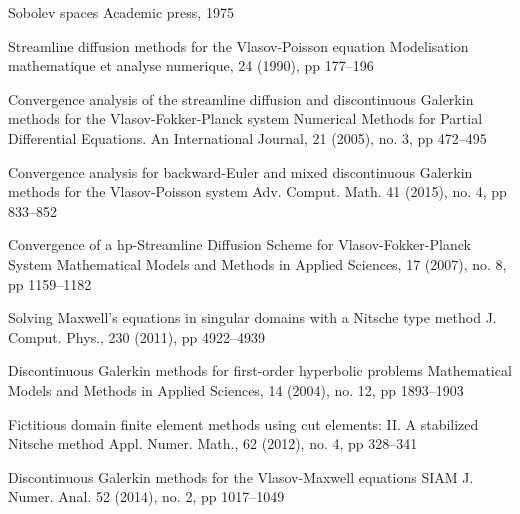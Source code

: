 \documentclass[reqno,a4paper]{amsart}
\theoremstyle{remark}
\numberwithin{equation}{section}
\begin{document}
\begin{thebibliography}{9999}

{Sobolev spaces}
{Academic press, 1975}

{Streamline diffusion methods for the Vlasov-Poisson equation}
{Modelisation mathematique et analyse numerique, 24 (1990), pp 177--196}

{Convergence analysis of the streamline diffusion and discontinuous Galerkin methods for the Vlasov-Fokker-Planck system}
{Numerical Methods for Partial Differential Equations. An International Journal, 21 (2005), no. 3, pp 472--495}

{Convergence analysis for backward-Euler and mixed discontinuous Galerkin 
methods for the Vlasov-Poisson system}{ Adv. Comput. Math. 41 (2015), no. 4, pp 833--852}



{Convergence of a hp-Streamline Diffusion Scheme for Vlasov-Fokker-Planck System}
{Mathematical Models and Methods in Applied Sciences, 17 (2007), no. 8, pp 1159--1182}

{Solving Maxwell's equations in singular domains with a Nitsche type method}
{J. Comput. Phys., 230 (2011), pp 4922--4939}


{Discontinuous Galerkin methods for first-order hyperbolic problems}
{Mathematical Models and Methods in Applied Sciences, 14 (2004), no. 12, pp 1893--1903}

{Fictitious domain finite element methods using cut elements: II. A stabilized Nitsche method}
{Appl. Numer. Math., 62 (2012), no. 4, pp 328--341}

{Discontinuous Galerkin methods for the Vlasov-Maxwell equations}
{SIAM J. Numer. Anal. 52 (2014), no. 2, pp 1017--1049}


\end{thebibliography}
\end{document}
